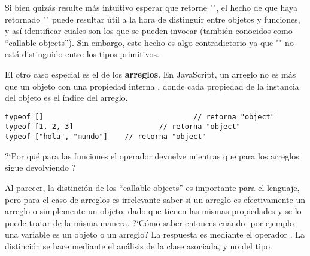 Si bien quizás resulte más intuitivo esperar que retorne "", el hecho de que haya retornado "" puede resultar útil a la hora de distinguir entre objetos y funciones, y así identificar cuales son los que se pueden invocar (también conocidos como "`callable objects"'). Sin embargo, este hecho es algo contradictorio ya que "" no está distinguido entre los tipos primitivos.

El otro caso especial es el de los \textbf{arreglos}. En JavaScript, un arreglo no es más que un objeto con una propiedad interna , donde cada propiedad de la instancia del objeto es el índice del arreglo.

\begin{lstlisting}[title={Analizando \code{typeof} de arreglos}]
typeof []									// retorna "object"
typeof [1, 2, 3]					// retorna "object"
typeof ["hola", "mundo"]	// retorna "object"
\end{lstlisting}

?`Por qué para las funciones el operador  devuelve  mientras que para los arreglos sigue devolviendo ? 

Al parecer, la distinción de los "`callable objects"' es importante para el lenguaje, pero para el caso de arreglos es irrelevante saber si un arreglo es efectivamente un arreglo o simplemente un objeto, dado que tienen las mismas propiedades y se lo puede tratar de la misma manera. ?`Cómo saber entonces cuando -por ejemplo- una variable es un objeto o un arreglo? La respuesta es mediante el operador . La distinción se hace mediante el análisis de la clase asociada, y no del tipo.


